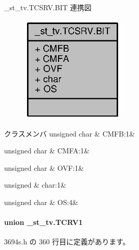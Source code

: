 \+\_\+st\+\_\+tv.\+T\+C\+S\+R\+V.\+B\+I\+T 連携図
\nopagebreak
\begin{figure}[H]
\begin{center}
\leavevmode
\includegraphics[width=142pt]{d5/d9e/struct__st__tv_8TCSRV_8BIT__coll__graph}
\end{center}
\end{figure}
\begin{DoxyFields}{クラスメンバ}
unsigned char\label{3694s_8h_a53dbeac724194c810805cbcc56802699}
&
C\+M\+F\+B\+:1&
\\
\hline

unsigned char\label{3694s_8h_a6295bf09747d11ccf65ae4128559e6e3}
&
C\+M\+F\+A\+:1&
\\
\hline

unsigned char\label{3694s_8h_a7f74ef1b079020a932a9f48bcaf217b0}
&
O\+V\+F\+:1&
\\
\hline

unsigned\label{3694s_8h_aa87deb01c5f539e6bda34829c8ef2368}
&
char\+:1&
\\
\hline

unsigned char\label{3694s_8h_a17bc10091293fdc562a6db69940ee924}
&
O\+S\+:4&
\\
\hline

\end{DoxyFields}
\label{union__st__tv_8TCRV1}
\paragraph{union \+\_\+st\+\_\+tv.\+T\+C\+R\+V1}


 3694s.\+h の 360 行目に定義があります。



